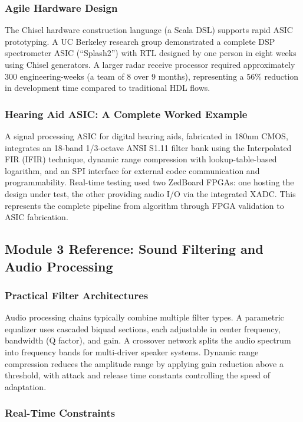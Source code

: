 \documentclass[11pt,letterpaper]{article}
\begin{document}
\subsubsection{Agile Hardware Design}

The Chisel hardware construction language (a Scala DSL) supports rapid ASIC prototyping. A UC Berkeley research group demonstrated a complete DSP spectrometer ASIC (``Splash2'') with RTL designed by one person in eight weeks using Chisel generators. A larger radar receive processor required approximately 300 engineering-weeks (a team of 8 over 9 months), representing a 56\% reduction in development time compared to traditional HDL flows.

\subsubsection{Hearing Aid ASIC: A Complete Worked Example}

A signal processing ASIC for digital hearing aids, fabricated in 180nm CMOS, integrates an 18-band 1/3-octave ANSI S1.11 filter bank using the Interpolated FIR (IFIR) technique, dynamic range compression with lookup-table-based logarithm, and an SPI interface for external codec communication and programmability. Real-time testing used two ZedBoard FPGAs: one hosting the design under test, the other providing audio I/O via the integrated XADC. This represents the complete pipeline from algorithm through FPGA validation to ASIC fabrication.

\subsection{Module 3 Reference: Sound Filtering and Audio Processing}

\subsubsection{Practical Filter Architectures}

Audio processing chains typically combine multiple filter types. A parametric equalizer uses cascaded biquad sections, each adjustable in center frequency, bandwidth (Q factor), and gain. A crossover network splits the audio spectrum into frequency bands for multi-driver speaker systems. Dynamic range compression reduces the amplitude range by applying gain reduction above a threshold, with attack and release time constants controlling the speed of adaptation.

\subsubsection{Real-Time Constraints}
\end{document}
